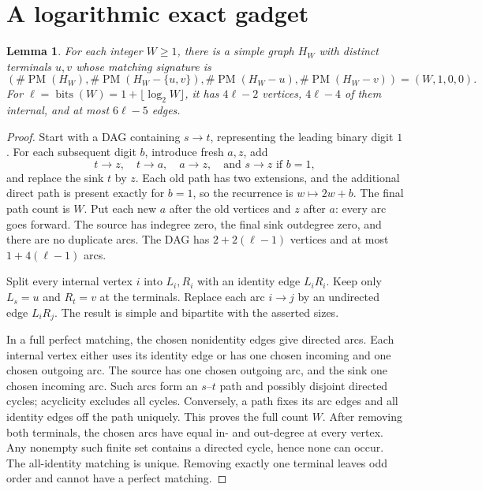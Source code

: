\documentclass[11pt]{article}
\newtheorem{lemma}[theorem]{Lemma}
\newcommand{\PM}{\operatorname{PM}}
\newcommand{\bits}{\operatorname{bits}}
\begin{document}
\section{A logarithmic exact gadget}
\begin{lemma}\label{lem:gadget}
For each integer $W\ge1$, there is a simple graph $H_W$ with distinct terminals $u,v$ whose matching signature is
\[
 (\#\PM(H_W),\#\PM(H_W-\{u,v\}),\#\PM(H_W-u),\#\PM(H_W-v))=(W,1,0,0).
\]
For $\ell=\bits(W)=1+\lfloor\log_2W\rfloor$, it has $4\ell-2$ vertices, $4\ell-4$ of them internal, and at most $6\ell-5$ edges.
\end{lemma}
\begin{proof}
Start with a DAG containing $s\to t$, representing the leading binary digit $1$. For each subsequent digit $b$, introduce fresh $a,z$, add
\[
 t\to z,\quad t\to a,\quad a\to z,\quad\text{and }s\to z\text{ if }b=1,
\]
and replace the sink $t$ by $z$. Each old path has two extensions, and the additional direct path is present exactly for $b=1$, so the recurrence is $w\mapsto2w+b$. The final path count is $W$. Put each new $a$ after the old vertices and $z$ after $a$: every arc goes forward. The source has indegree zero, the final sink outdegree zero, and there are no duplicate arcs. The DAG has $2+2(\ell-1)$ vertices and at most $1+4(\ell-1)$ arcs.

Split every internal vertex $i$ into $L_i,R_i$ with an identity edge $L_iR_i$. Keep only $L_s=u$ and $R_t=v$ at the terminals. Replace each arc $i\to j$ by an undirected edge $L_iR_j$. The result is simple and bipartite with the asserted sizes.

In a full perfect matching, the chosen nonidentity edges give directed arcs. Each internal vertex either uses its identity edge or has one chosen incoming and one chosen outgoing arc. The source has one chosen outgoing arc, and the sink one chosen incoming arc. Such arcs form an $s$--$t$ path and possibly disjoint directed cycles; acyclicity excludes all cycles. Conversely, a path fixes its arc edges and all identity edges off the path uniquely. This proves the full count $W$. After removing both terminals, the chosen arcs have equal in- and out-degree at every vertex. Any nonempty such finite set contains a directed cycle, hence none can occur. The all-identity matching is unique. Removing exactly one terminal leaves odd order and cannot have a perfect matching.
\end{proof}
\end{document}
